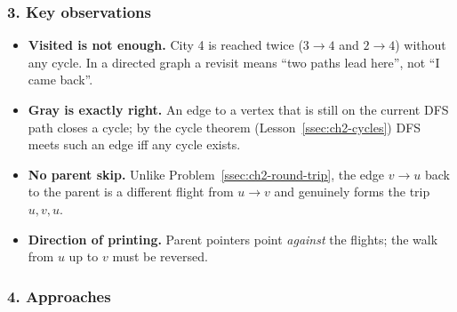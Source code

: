 \subsubsection*{3. Key observations}

\begin{itemize}[leftmargin=*]
    \item \textbf{Visited is not enough.} City 4 is reached twice ($3 \to 4$ and $2 \to 4$) without any cycle. In a directed graph a revisit means ``two paths lead here'', not ``I came back''.
    \item \textbf{Gray is exactly right.} An edge to a vertex that is still on the current DFS path closes a cycle; by the cycle theorem (Lesson~\ref{ssec:ch2-cycles}) DFS meets such an edge iff any cycle exists.
    \item \textbf{No parent skip.} Unlike Problem~\ref{ssec:ch2-round-trip}, the edge $v \to u$ back to the parent is a different flight from $u \to v$ and genuinely forms the trip $u, v, u$.
    \item \textbf{Direction of printing.} Parent pointers point \emph{against} the flights; the walk from $u$ up to $v$ must be reversed.
\end{itemize}

\subsubsection*{4. Approaches}

